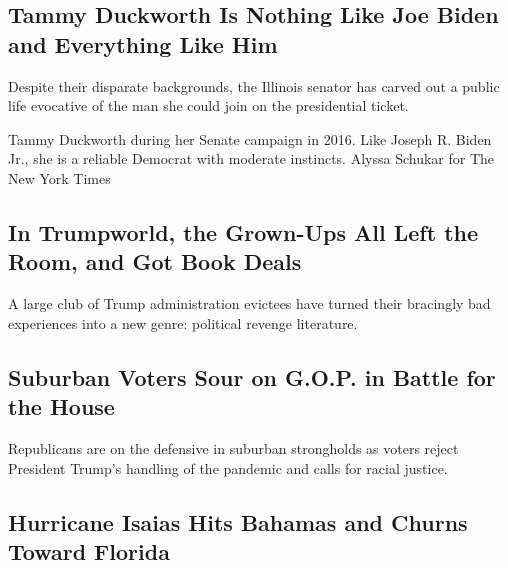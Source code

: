 \href{/2020/08/01/us/politics/tammy-duckworth-biden-vp.html}{}

\hypertarget{tammy-duckworth-is-nothing-like-joe-biden-and-everything-like-him}{%
\subsection{Tammy Duckworth Is Nothing Like Joe Biden and Everything
Like
Him}\label{tammy-duckworth-is-nothing-like-joe-biden-and-everything-like-him}}

Despite their disparate backgrounds, the Illinois senator has carved out
a public life evocative of the man she could join on the presidential
ticket.

\href{/2020/08/01/us/politics/tammy-duckworth-biden-vp.html}{}

Tammy Duckworth during her Senate campaign in 2016. Like Joseph R. Biden
Jr., she is a reliable Democrat with moderate instincts. Alyssa Schukar
for The New York Times

\href{/2020/08/01/us/politics/trump-books.html}{}

\hypertarget{in-trumpworld-the-grown-ups-all-left-the-room-and-got-book-deals}{%
\subsection{In Trumpworld, the Grown-Ups All Left the Room, and Got Book
Deals}\label{in-trumpworld-the-grown-ups-all-left-the-room-and-got-book-deals}}

A large club of Trump administration evictees have turned their
bracingly bad experiences into a new genre: political revenge
literature.

\href{/2020/08/01/us/politics/trump-suburban-voters-republicans-house.html}{}

\hypertarget{suburban-voters-sour-on-gop-in-battle-for-the-house}{%
\subsection{Suburban Voters Sour on G.O.P. in Battle for the
House}\label{suburban-voters-sour-on-gop-in-battle-for-the-house}}

Republicans are on the defensive in suburban strongholds as voters
reject President Trump's handling of the pandemic and calls for racial
justice.

\href{/2020/08/01/us/hurricane-isaias-track.html}{}

\hypertarget{hurricane-isaias-hits-bahamas-and-churns-toward-florida}{%
\subsection{Hurricane Isaias Hits Bahamas and Churns Toward
Florida}\label{hurricane-isaias-hits-bahamas-and-churns-toward-florida}}

